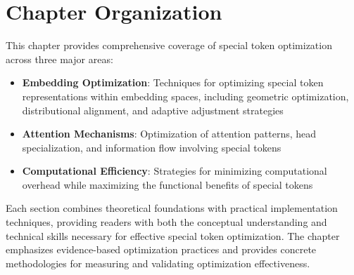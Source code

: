 \section{Chapter Organization}

This chapter provides comprehensive coverage of special token optimization across three major areas:

\begin{itemize}
\item \textbf{Embedding Optimization}: Techniques for optimizing special token representations within embedding spaces, including geometric optimization, distributional alignment, and adaptive adjustment strategies
\item \textbf{Attention Mechanisms}: Optimization of attention patterns, head specialization, and information flow involving special tokens
\item \textbf{Computational Efficiency}: Strategies for minimizing computational overhead while maximizing the functional benefits of special tokens
\end{itemize}

Each section combines theoretical foundations with practical implementation techniques, providing readers with both the conceptual understanding and technical skills necessary for effective special token optimization. The chapter emphasizes evidence-based optimization practices and provides concrete methodologies for measuring and validating optimization effectiveness.